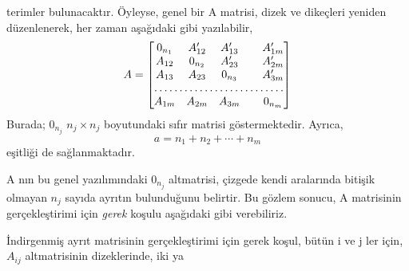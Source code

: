 \documentclass[11pt]{amsbook}
\begin{document}

terimler bulunacaktır. Öyleyse, genel bir A matrisi, dizek ve dikeçleri yeniden düzenlenerek, her zaman aşağıdaki gibi yazılabilir,
\[
	A = 
	\begin{bmatrix}
		0_{n_{1}} & A_{12}^{\prime} & A_{13}^{\prime} &  & A_{1m}^{\prime} \\
		A_{12} & 0_{n_{2}} & A_{23}^{\prime} &  & A_{2m}^{\prime} \\
		A_{13} & A_{23} & 0_{n_{3}} &  & A_{3m}^{\prime} \\
		\hdotsfor{5} \\
		A_{1m} & A_{2m} & A_{3m} &  & 0_{n_{m}}
	\end{bmatrix}
\]
Burada; $0_{n_{j}}$ $n_{j} \times n_{j}$ boyutundaki sıfır matrisi göstermektedir. Ayrıca,
\[
	a = n_{1}+n_{2}+ \cdots + n_{m}
\]
eşitliği de sağlanmaktadır.

A nın bu genel yazılımındaki $0_{n_{j}}$ altmatrisi, çizgede kendi aralarında bitişik olmayan $n_{j}$ sayıda ayrıtın bulunduğunu belirtir. Bu gözlem sonucu, A matrisinin gerçekleştirimi için \emph{gerek} koşulu aşağıdaki gibi verebiliriz.
\begin{theorem}
	İndirgenmiş ayrıt matrisinin gerçekleştirimi için gerek koşul, bütün i ve j ler için, $A_{ij}$ altmatrisinin dizeklerinde, iki ya
\end{theorem}
\end{document}
